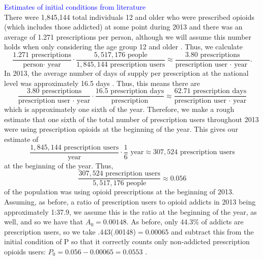 \documentclass[12pt]{article}
\begin{document}
\textcolor{blue}{Estimates of initial conditions from literature} \\
There were 1,845,144 total individuals 12 and older who were prescribed opioids (which includes those addicted) at some point during 2013 
and there was an average of 1.271 prescriptions per person, although we will assume this number holds when only considering the age group 12 and older \cite{CDC6}. 
Thus, we calculate 
$$\frac{1.271 \text{ prescriptions}}{\text{person$\cdot$ year}}\cdot \frac{5,517,176 \text{ people}}{1,845,144 \text{ prescription users}} \approx \frac{ 3.80 \text{ prescriptions}}{\text{prescription user $\cdot$ year }}.$$  
In 2013, the average number of days of supply per prescription at the national level was approximately 16.5 days \cite{CDC7}.
Thus, this means there are 
$$\frac{3.80 \text{ prescriptions}}{\text{prescription user $\cdot$ year}} \cdot \frac{{16.5 \text{ prescription days}}}{\text{prescription}} \approx \frac{62.71 \text{ prescription days}}{\text{prescription user $\cdot$ year}} $$
which is approximately one sixth of the year. Therefore, we make a rough estimate that one sixth of the total number of prescription users throughout 2013 were using prescription opioids at the beginning of the year. %
 This gives our estimate of 
$$\frac{1,845,144 \text{ prescription users}}{\text{year}} \cdot \frac{1}{6} \text{ year} \approx 307,524 \text{ prescription users}$$
at the beginning of the year. Thus, 
$$\frac{307,524 \text{ prescription users}}{5,517,176 \text{ people}} \approx 0.056 $$
of the population was using opioid prescriptions at the beginning of 2013. 
Assuming, as before, a ratio of prescription users to opioid addicts in 2013 being approximately 1:37.9, we assume this is the ratio at the beginning of the year, as well, and so we have that $A_0=0.00148.$ As before, only 44.3\% of addicts are prescription users, so we take .443(.00148)$=$0.00065 and subtract this from the initial condition of P so that it correctly counts only non-addicted prescription opioids users: $P_0=0.056-0.00065=0.0553$ \cite{Han}. %
\\ \\
\end{document}
